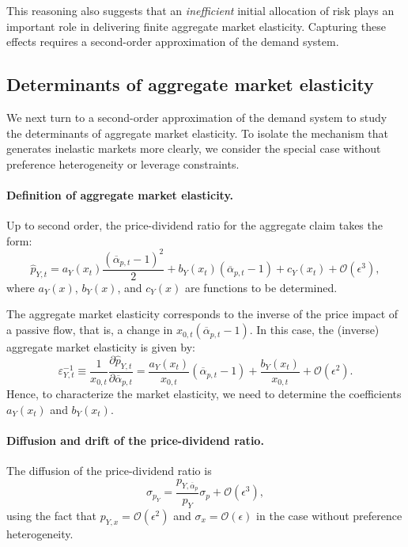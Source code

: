 \documentclass[12pt,english]{article}
\begin{document}
This reasoning also suggests that an \textit{inefficient} initial allocation of risk plays an important role in delivering finite aggregate market elasticity.
Capturing these effects requires a second-order approximation of the demand system.

\subsection{Determinants of aggregate market elasticity}

We next turn to a second-order approximation of the demand system to study the determinants of aggregate market elasticity.
To isolate the mechanism that generates inelastic markets more clearly, we consider the special case without preference heterogeneity or leverage constraints.  

\paragraph{Definition of aggregate market elasticity.}
Up to second order, the price-dividend ratio for the aggregate claim takes the form:
\begin{equation}\label{eq:p_Y_second_order}
    \hat{p}_{Y,t} = a_Y(x_t) \frac{(\overline{\alpha}_{p,t}-1)^2}{2}  + b_Y(x_t) (\overline{\alpha}_{p,t}-1) + c_Y(x_t) + \mathcal{O}(\epsilon^3),
\end{equation}
where $a_Y(x)$, $b_Y(x)$, and $c_Y(x)$ are functions to be determined.

The aggregate market elasticity corresponds to the inverse of the price impact of a passive flow, that is, a change in $x_{0,t} (\overline{\alpha}_{p,t}-1)$. 
In this case, the (inverse) aggregate market elasticity is given by:
\begin{equation}
    \varepsilon_{Y,t}^{-1} \equiv \frac{1}{x_{0,t}} \frac{\partial \hat{p}_{Y,t}}{\partial \overline{\alpha}_{p,t}} = \frac{a_Y(x_t)}{x_{0,t}} (\overline{\alpha}_{p,t}-1)  + \frac{b_Y(x_t)}{x_{0,t}}+ \mathcal{O}(\epsilon^2).
\end{equation}
Hence, to characterize the market elasticity, we need to determine the coefficients $a_Y(x_t)$ and $b_Y(x_t)$.

\paragraph{Diffusion and drift of the price-dividend ratio.}
The diffusion of the price-dividend ratio is
\begin{equation}
    \sigma_{p_Y} = \frac{p_{Y,\overline{\alpha}_p}}{p_{Y}} \sigma_p + \mathcal{O}(\epsilon^3),
\end{equation}
using the fact that $p_{Y,x} = \mathcal{O}(\epsilon^2)$ and $\sigma_{x} = \mathcal{O}(\epsilon)$ in the case without preference heterogeneity.  
\end{document}
